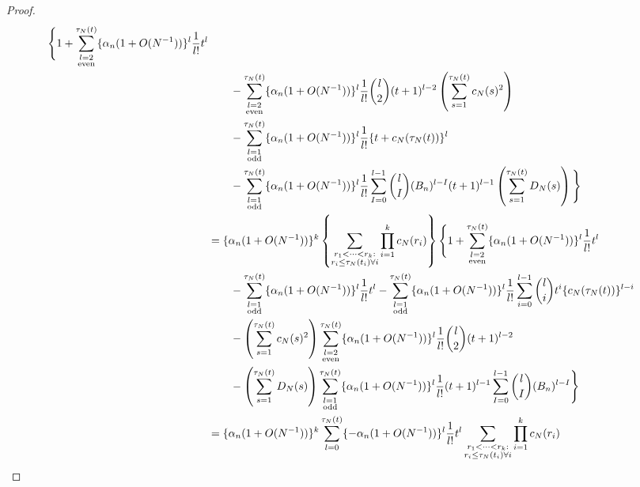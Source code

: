 \documentclass{article}
\newcommand{\1}[1]{\mathbbm{1}_{#1}}
\begin{document}
\begin{proof}
\begin{align}
\Bigg\{ 1 + \sum_{\substack{ l=2 \\ \text{even} }}^{\tau_N(t)} 
\{ \alpha_n (1 + O(N^{-1}) ) \}^l \frac{1}{l!} t^l \notag\\
&\qquad- \sum_{\substack{ l=2 \\ \text{even} }}^{\tau_N(t)}
\{ \alpha_n (1 + O(N^{-1}) ) \}^l \frac{1}{l!} \binom{l}{2} (t+1)^{l-2}
\left( \sum_{s=1}^{\tau_N(t)} c_N(s)^2 \right) \notag\\
&\qquad- \sum_{\substack{ l=1 \\ \text{odd} }}^{\tau_N(t)}
\{ \alpha_n (1 + O(N^{-1}) ) \}^l \frac{1}{l!}
\{ t + c_N(\tau_N(t)) \}^l \notag\\
&\qquad- \sum_{\substack{ l=1 \\ \text{odd} }}^{\tau_N(t)}
\{ \alpha_n (1 + O(N^{-1}) ) \}^l \frac{1}{l!}
\sum_{I=0}^{l-1} \binom{l}{I} (B_n)^{l-I} (t+1)^{l-1}
\left( \sum_{s=1}^{\tau_N(t)} D_N(s) \right) \Bigg\} \notag\\
&= \{ \alpha_n (1 + O(N^{-1}) ) \}^k
\left\{ \sum_{\substack{r_1 <\dots< r_k :\\ r_i \leq \tau_N(t_i) \forall i}} \prod_{i=1}^k c_N(r_i) \right\}
\Bigg\{ 1 
+ \sum_{\substack{ l=2 \\ \text{even} }}^{\tau_N(t)} \{ \alpha_n (1 + O(N^{-1}) ) \}^l \frac{1}{l!} t^l \notag\\
&\qquad- \sum_{\substack{ l=1 \\ \text{odd} }}^{\tau_N(t)} \{ \alpha_n (1 + O(N^{-1}) ) \}^l \frac{1}{l!} t^l 
- \sum_{\substack{ l=1 \\ \text{odd} }}^{\tau_N(t)} \{ \alpha_n (1 + O(N^{-1}) ) \}^l \frac{1}{l!}
\sum_{i=0}^{l-1} \binom{l}{i} t^i \{ c_N(\tau_N(t)) \}^{l-i} \notag\\
&\qquad- \left( \sum_{s=1}^{\tau_N(t)} c_N(s)^2 \right)
\sum_{\substack{ l=2 \\ \text{even} }}^{\tau_N(t)} \{ \alpha_n (1 + O(N^{-1}) ) \}^l 
\frac{1}{l!} \binom{l}{2} (t+1)^{l-2} \notag\\
&\qquad- \left( \sum_{s=1}^{\tau_N(t)} D_N(s) \right)
\sum_{\substack{ l=1 \\ \text{odd} }}^{\tau_N(t)} \{ \alpha_n (1 + O(N^{-1}) ) \}^l \frac{1}{l!} (t+1)^{l-1}
\sum_{I=0}^{l-1} \binom{l}{I} (B_n)^{l-I} \Bigg\} \notag\\
&= \{ \alpha_n (1 + O(N^{-1}) ) \}^k
\sum_{l=0}^{\tau_N(t)} \{ - \alpha_n (1 + O(N^{-1}) ) \}^l \frac{1}{l!} t^l 
\sum_{\substack{r_1 <\dots< r_k :\\ r_i \leq \tau_N(t_i) \forall i}} \prod_{i=1}^k c_N(r_i) \notag\\

\end{align}
\end{proof}
\end{document}
